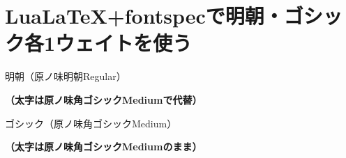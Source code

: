 \documentclass{ltjsarticle}
\begin{document}
\section{Lua\LaTeX +fontspecで明朝・ゴシック各1ウェイトを使う}

\rmfamily
\mcfamily
\mdseries
明朝（原ノ味明朝Regular）

\bfseries
（太字は原ノ味角ゴシックMediumで代替）

\sffamily
\gtfamily
\mdseries
ゴシック（原ノ味角ゴシックMedium）

\bfseries
（太字は原ノ味角ゴシックMediumのまま）
\end{document}
